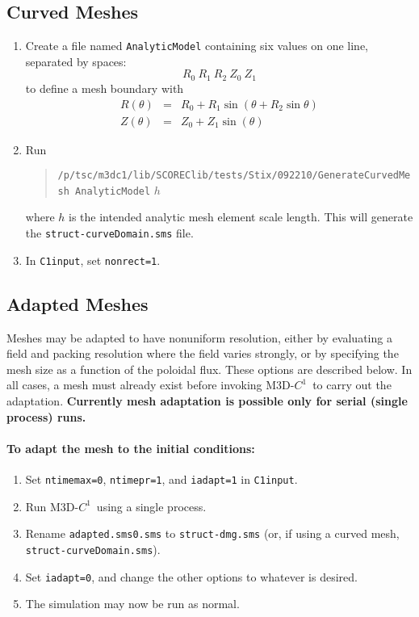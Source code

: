 \documentclass[letterpaper]{book}
\newcommand{\codename}{\textsc{M3D-$C^1$}}
\begin{document}
\subsection{Curved Meshes}

\begin{enumerate}
\item Create a file named \texttt{AnalyticModel} containing six values
  on one line, separated by spaces:
  \[
  R_0\ R_1\ R_2\ Z_0\ Z_1
  \]
  to define a mesh boundary with
  \begin{eqnarray*}
    R(\theta) & = & R_0 + R_1 \sin(\theta + R_2 \sin{\theta})\\
    Z(\theta) & = & Z_0 + Z_1 \sin(\theta)
  \end{eqnarray*}
\item Run
  \begin{quote}
    \texttt{/p/tsc/m3dc1/lib/SCOREClib/tests/Stix/092210/GenerateCurvedMesh
      AnalyticModel} $h$
  \end{quote}
  where $h$ is the intended analytic mesh element scale length.  This
  will generate the \texttt{struct-curveDomain.sms} file.
\item In \texttt{C1input}, set \texttt{nonrect=1}.
\end{enumerate}


\subsection{Adapted Meshes}

Meshes may be adapted to have nonuniform resolution, either by
evaluating a field and packing resolution where the field varies
strongly, or by specifying the mesh size as a function of the poloidal
flux.  These options are described below.  In all cases, a mesh must
already exist before invoking \codename\ to carry out the adaptation.
\textbf{Currently mesh adaptation is possible only for serial (single
  process) runs.}

\paragraph{To adapt the mesh to the initial conditions:}
\begin{enumerate}
\item Set \texttt{ntimemax=0}, \texttt{ntimepr=1}, and
  \texttt{iadapt=1} in \texttt{C1input}.
\item Run \codename\ using a single process.  
\item Rename \texttt{adapted.sms0.sms} to \texttt{struct-dmg.sms} (or,
  if using a curved mesh, \texttt{struct-curveDomain.sms}).
\item Set \texttt{iadapt=0}, and change the other options to whatever
  is desired.  
\item The simulation may now be run as normal.
\end{enumerate}
\end{document}
